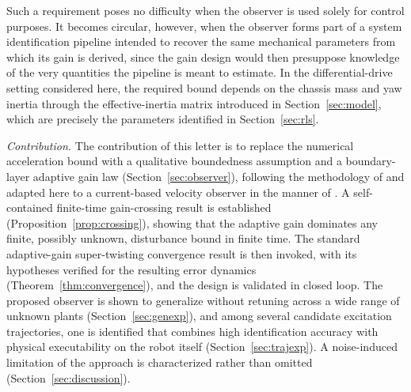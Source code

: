 \documentclass[letterpaper, 10 pt, conference]{ieeeconf}
\begin{document}
Such a requirement poses no difficulty when the observer is used solely for control purposes. It becomes circular, however, when the observer forms part of a system identification pipeline intended to recover the same mechanical parameters from which its gain is derived, since the gain design would then presuppose knowledge of the very quantities the pipeline is meant to estimate. In the differential-drive setting considered here, the required bound depends on the chassis mass and yaw inertia through the effective-inertia matrix introduced in Section~\ref{sec:model}, which are precisely the parameters identified in Section~\ref{sec:rls}.

\emph{Contribution.} The contribution of this letter is to replace the numerical acceleration bound with a qualitative boundedness assumption and a boundary-layer adaptive gain law (Section~\ref{sec:observer}), following the methodology of \cite{Plestan2010,Shtessel2012} and adapted here to a current-based velocity observer in the manner of \cite{Bahrami2020}. A self-contained finite-time gain-crossing result is established (Proposition~\ref{prop:crossing}), showing that the adaptive gain dominates any finite, possibly unknown, disturbance bound in finite time. The standard adaptive-gain super-twisting convergence result is then invoked, with its hypotheses verified for the resulting error dynamics (Theorem~\ref{thm:convergence}), and the design is validated in closed loop. The proposed observer is shown to generalize without retuning across a wide range of unknown plants (Section~\ref{sec:genexp}), and among several candidate excitation trajectories, one is identified that combines high identification accuracy with physical executability on the robot itself (Section~\ref{sec:trajexp}). A noise-induced limitation of the approach is characterized rather than omitted (Section~\ref{sec:discussion}).
\end{document}
